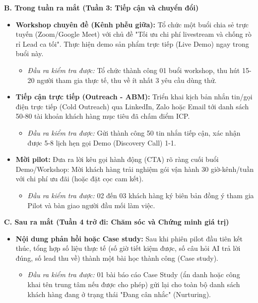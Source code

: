 \textbf{B. Trong tuần ra mắt (Tuần 3: Tiếp cận và chuyển đổi)}
\begin{itemize}
    \item \textbf{Workshop chuyên đề (Kênh phễu giữa):} Tổ chức một buổi chia sẻ trực tuyến (Zoom/Google Meet) với chủ đề "Tối ưu chi phí livestream và chống rò rỉ Lead ca tối". Thực hiện demo sản phẩm trực tiếp (Live Demo) ngay trong buổi này.
    \begin{itemize}
        \item \textit{Đầu ra kiểm tra được:} Tổ chức thành công 01 buổi workshop, thu hút 15-20 người tham gia thực tế, thu về ít nhất 3 yêu cầu dùng thử.
    \end{itemize}
    \item \textbf{Tiếp cận trực tiếp (Outreach - ABM):} Triển khai kịch bản nhắn tin/gọi điện trực tiếp (Cold Outreach) qua LinkedIn, Zalo hoặc Email tới danh sách 50-80 tài khoản khách hàng mục tiêu đã chấm điểm ICP.
    \begin{itemize}
        \item \textit{Đầu ra kiểm tra được:} Gửi thành công 50 tin nhắn tiếp cận, xác nhận được 5-8 lịch hẹn gọi Demo (Discovery Call) 1-1.
    \end{itemize}
    \item \textbf{Mời pilot:} Đưa ra lời kêu gọi hành động (CTA) rõ ràng cuối buổi Demo/Workshop: Mời khách hàng trải nghiệm gói vận hành 30 giờ-kênh/tuần với chi phí ưu đãi (hoặc đặt cọc cam kết).
    \begin{itemize}
        \item \textit{Đầu ra kiểm tra được:} 02 đến 03 khách hàng ký biên bản đồng ý tham gia Pilot và bàn giao người đầu mối làm việc.
    \end{itemize}
\end{itemize}

\textbf{C. Sau ra mắt (Tuần 4 trở đi: Chăm sóc và Chứng minh giá trị)}
\begin{itemize}
    \item \textbf{Nội dung phản hồi hoặc Case study:} Sau khi phiên pilot đầu tiên kết thúc, tổng hợp số liệu thực tế (số giờ tiết kiệm được, số câu hỏi AI trả lời đúng, số lead thu về) thành một bài học thành công (Case study).
    \begin{itemize}
        \item \textit{Đầu ra kiểm tra được:} 01 bài báo cáo Case Study (ẩn danh hoặc công khai tên trung tâm nếu được cho phép) gửi lại cho toàn bộ danh sách khách hàng đang ở trạng thái "Đang cân nhắc" (Nurturing).
    \end{itemize}
\end{itemize}


